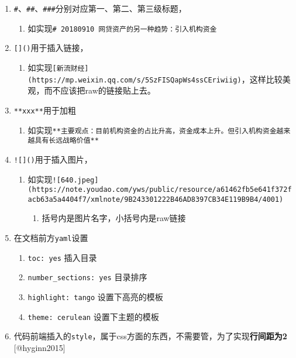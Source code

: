 \documentclass[]{article}
\providecommand{\tightlist}{%
  \setlength{\itemsep}{0pt}\setlength{\parskip}{0pt}}
\begin{document}
\begin{enumerate}
\def\labelenumi{\arabic{enumi}.}
\tightlist
\item
  \texttt{\#}、\texttt{\#\#}、\texttt{\#\#\#}分别对应第一、第二、第三级标题，

  \begin{enumerate}
  \def\labelenumii{\arabic{enumii}.}
  \tightlist
  \item
    如实现\texttt{\#\ 20180910\ 网贷资产的另一种趋势：引入机构资金}
  \end{enumerate}
\item
  \texttt{{[}{]}()}用于插入链接，

  \begin{enumerate}
  \def\labelenumii{\arabic{enumii}.}
  \tightlist
  \item
    如实现\texttt{{[}新流财经{]}(https://mp.weixin.qq.com/s/5SzFISQapWs4ssCEriwiig)}，这样比较美观，而不应该把raw的链接贴上去。
  \end{enumerate}
\item
  \texttt{**xxx**}用于加粗

  \begin{enumerate}
  \def\labelenumii{\arabic{enumii}.}
  \tightlist
  \item
    如实现\texttt{**主要观点：目前机构资金的占比升高，资金成本上升。但引入机构资金越来越具有长远战略价值**}
  \end{enumerate}
\item
  \texttt{!{[}{]}()}用于插入图片，

  \begin{enumerate}
  \def\labelenumii{\arabic{enumii}.}
  \tightlist
  \item
    如实现\texttt{!{[}640.jpeg{]}(https://note.youdao.com/yws/public/resource/a61462fb5e641f372facb63a5a4404f7/xmlnote/9B243301222B46AD8397CB34E119B9B4/4001)}

    \begin{enumerate}
    \def\labelenumiii{\arabic{enumiii}.}
    \tightlist
    \item
      括号内是图片名字，小括号内是raw链接
    \end{enumerate}
  \end{enumerate}
\item
  在文档前方\texttt{yaml}设置

  \begin{enumerate}
  \def\labelenumii{\arabic{enumii}.}
  \tightlist
  \item
    \texttt{toc:\ yes} 插入目录
  \item
    \texttt{number\_sections:\ yes} 目录排序
  \item
    \texttt{highlight:\ tango} 设置下高亮的模板
  \item
    \texttt{theme:\ cerulean} 设置下主题的模板
  \end{enumerate}
\item
  代码前端插入的\texttt{style}，属于css方面的东西，不需要管，为了实现\textbf{行间距为2}
  {[}@hyginn2015{]}
\end{enumerate}
\end{document}
